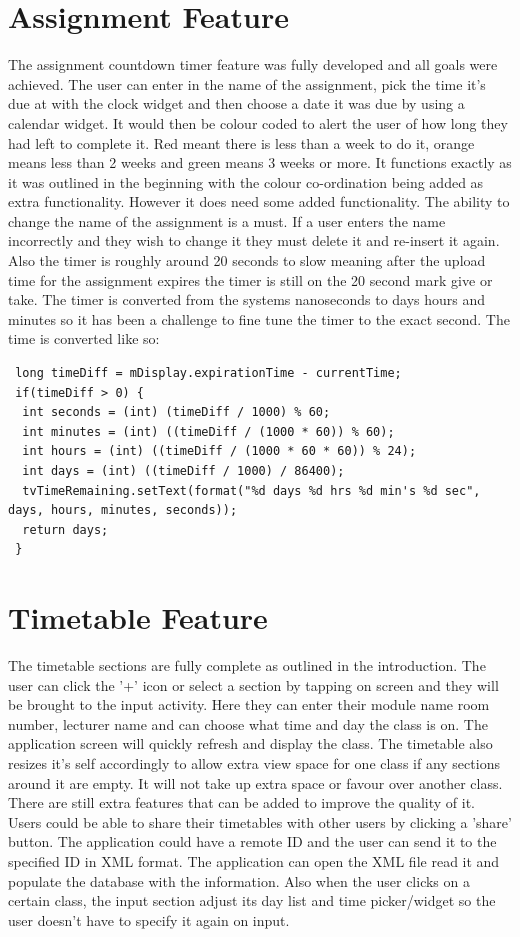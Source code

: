 \section{Assignment Feature}
The assignment countdown timer feature was fully developed and all goals were achieved. The user can enter in the name of the assignment, pick the time it's due at with the clock widget and then choose a date it was due by using a calendar widget. It would then be colour coded to alert the user of how long they had left to complete it. Red meant there is less than a week to do it, orange means less than 2 weeks and green means 3 weeks or more. It functions exactly as it was outlined in the beginning with the colour co-ordination being added as extra functionality. However it does need some added functionality. The ability to change the name of the assignment is a must. If a user enters the name incorrectly and they wish to change it they must delete it and re-insert it again. Also the timer is roughly around 20 seconds to slow meaning after the upload time for the assignment expires the timer is still on the 20 second mark give or take. The timer is converted from the systems nanoseconds to days hours and minutes so it has been a challenge to fine tune the timer to the exact second. The time is converted like so:
\begin{verbatim}
 long timeDiff = mDisplay.expirationTime - currentTime;
 if(timeDiff > 0) {
  int seconds = (int) (timeDiff / 1000) % 60;
  int minutes = (int) ((timeDiff / (1000 * 60)) % 60);
  int hours = (int) ((timeDiff / (1000 * 60 * 60)) % 24);
  int days = (int) ((timeDiff / 1000) / 86400);
  tvTimeRemaining.setText(format("%d days %d hrs %d min's %d sec", days, hours, minutes, seconds));
  return days;
 }
\end{verbatim}

\section{Timetable Feature}
The timetable sections are fully complete as outlined in the introduction. The user can click the '+' icon or select a section by tapping on screen and they will be brought to the input activity. Here they can enter their module name room number, lecturer name and can choose what time and day the class is on. The application screen will quickly refresh and display the class. The timetable also resizes it's self accordingly to allow extra view space for one class if any sections around it are empty. It will not take up extra space or favour over another class. There are still extra features that can be added to improve the quality of it. Users could be able to share their timetables with other users by clicking a 'share' button. The application could have a remote ID and the user can send it to the specified ID in XML format. The application can open the XML file read it and populate the database with the information. Also when the user clicks on a certain class, the input section adjust its day list and time picker/widget so the user doesn't have to specify it again on input.


